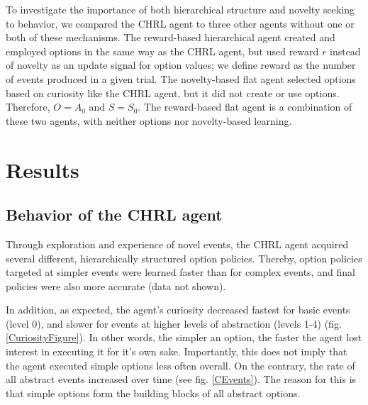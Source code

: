 \documentclass{article}
\begin{document}
To investigate the importance of both hierarchical structure and novelty seeking to behavior, we compared the CHRL agent to three other agents without one or both of these mechanisms. The reward-based hierarchical agent created and employed options in the same way as the CHRL agent, but used reward $r$ instead of novelty as an update signal for option values; we define reward as the number of events produced in a given trial.
The novelty-based flat agent selected options based on curiosity like the CHRL agent, but it did not create or use options. Therefore, $O = A_0$ and $S = S_0$. The reward-based flat agent is a combination of these two agents, with neither options nor novelty-based learning.


\section{Results}

\subsection{Behavior of the CHRL agent} \label{Results CHRL}

Through exploration and experience of novel events, the CHRL agent acquired several different, hierarchically structured option policies. Thereby, option policies targeted at simpler events were learned faster than for complex events, and final policies were also more accurate (data not shown).

In addition, as expected, the agent's curiosity decreased fastest for basic events (level 0), and slower for events at higher levels of abstraction (levels 1-4) (fig. \ref{CuriosityFigure}). In other words, the simpler an option, the faster the agent lost interest in executing it for it's own sake. Importantly, this does not imply that the agent executed simple options less often overall. On the contrary, the rate of all abstract events increased over time (see fig. \ref{CEvents}). The reason for this is that simple options form the building blocks of all abstract options.

\end{document}
